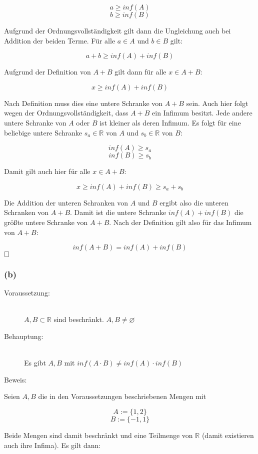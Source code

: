 \documentclass[11pt, a4paper]{article}
\begin{document}
		\[ a \geq inf(A) \]
		\[ b \geq inf(B) \]

		Aufgrund der Ordnungsvollständigkeit gilt dann die Ungleichung auch bei Addition der beiden Terme. Für alle $a \in A$ und $b \in B$ gilt:

		\[ a+b \geq inf(A)+ inf(B) \]

		Aufgrund der Definition von $A+B$ gilt dann für alle $x \in A+B$:

		\[ x \geq inf(A) + inf(B) \]

		Nach Definition muss dies eine untere Schranke von $A+B$ sein. Auch hier folgt wegen der Ordnungsvollständigkeit, dass $A+B$ ein Infimum besitzt.
		Jede andere untere Schranke von $A$ oder $B$ ist kleiner als deren Infimum. Es folgt für eine beliebige untere Schranke $s_a \in \mathbb{R}$ von $A$ und $s_b \in \mathbb{R}$ von $B$:

		\[ inf(A) \geq s_a \]
		\[ inf(B) \geq s_b \]

		Damit gilt auch hier für alle $x \in A+B$:

		\[ x \geq inf(A) + inf(B) \geq s_a + s_b \]

		\newpage

		Die Addition der unteren Schranken von $A$ und $B$ ergibt also die unteren Schranken von $A+B$. Damit ist die untere Schranke $inf(A) + inf(B)$ die größte untere Schranke von $A+B$. Nach der Definition gilt also für das Infimum von $A+B$:

		\[ inf(A+B) = inf(A) + inf(B) \]
		$\hfill\Box$


	\subsubsection*{(b)}

		\begin{description}
			\item[Voraussetzung:] \hfill \\
				$A,B \subset \mathbb{R}$ sind beschränkt. $A,B \neq \varnothing$ \hfill 
			\item[Behauptung:] \hfill \\
				Es gibt $A,B$ mit $inf(A\cdot B) \neq inf(A) \cdot inf(B)$ \hfill
			\item[Beweis:] 
		\end{description}

		Seien $A,B$ die in den Voraussetzungen beschriebenen Mengen mit 

		\[ A := \{ 1,2 \} \]
		\[ B := \{ -1,1 \} \]

		Beide Mengen sind damit beschränkt und eine Teilmenge von $\mathbb{R}$ (damit existieren auch ihre Infima). Es gilt dann:
\end{document}
